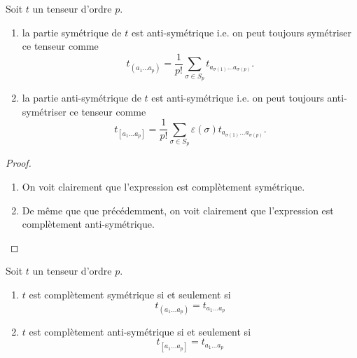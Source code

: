 \documentclass[a4paper,11pt]{report}
\begin{document}
                \begin{prop}\begin{leftbar}
                    Soit $t$ un tenseur d'ordre $p$.
                    \begin{enumerate}[label = \textit{\roman*)}]
                        \item la partie symétrique de $t$ est anti-symétrique i.e. on peut toujours symétriser ce tenseur comme
                        \begin{equation}
                            t_{(a_1\dots a_p)} = \frac{1}{p!} \sum_{\sigma\in S_p} t_{a_{\sigma(1)}\dots a_{\sigma(p)}}.
                        \end{equation}
                        \item la partie anti-symétrique de $t$ est anti-symétrique i.e. on peut toujours anti-symétriser ce tenseur comme
                        \begin{equation}
                            t_{[a_1\dots a_p]} = \frac{1}{p!} \sum_{\sigma\in S_p}\varepsilon(\sigma) t_{a_{\sigma(1)}\dots a_{\sigma(p)}}.
                        \end{equation}
                    \end{enumerate}
                \end{leftbar}\end{prop}
                
                \begin{proof}${}$
                    \begin{enumerate}[label = \textit{\roman*)}]
                        \item On voit clairement que l'expression est complètement symétrique.
                        \item De même que que précédemment, on voit clairement que l'expression est complètement anti-symétrique.
                    \end{enumerate}
                \end{proof}
                
                \begin{prop}\begin{leftbar}
                    Soit $t$ un tenseur d'ordre $p$.
                    \begin{enumerate}[label = \textit{\roman*)}]
                        \item $t$ est complètement symétrique si et seulement si
                        \begin{equation}
                            t_{(a_1\dots a_p)} = t_{a_1\dots a_p}
                        \end{equation}
                        \item $t$ est complètement anti-symétrique si et seulement si
                        \begin{equation}
                            t_{[a_1\dots a_p]} = t_{a_1\dots a_p}
                        \end{equation}
                    \end{enumerate}
                \end{leftbar}\end{prop}
                
\end{document}
